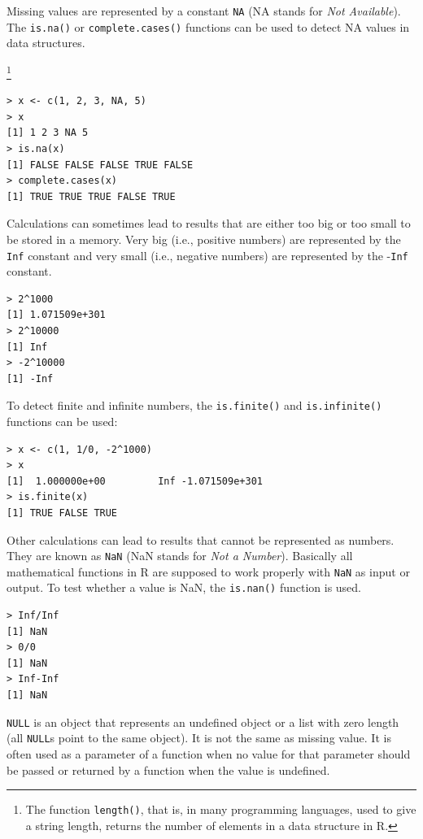 Missing values are represented by a constant \texttt{NA} (NA stands for \textit{Not Available}).
The \texttt{is.na()} or \texttt{complete.cases()} functions can be used to detect NA values
in data structures.

\footnote{The function \texttt{length()}, that is, in many programming languages, used to give a string length, returns the number of elements in a data structure in R.}

\begin{verbatim}
> x <- c(1, 2, 3, NA, 5)
> x
[1] 1 2 3 NA 5
> is.na(x)
[1] FALSE FALSE FALSE TRUE FALSE
> complete.cases(x)
[1] TRUE TRUE TRUE FALSE TRUE
\end{verbatim}

Calculations can sometimes lead to results that are either too big or too small
to be stored in a memory. Very big (i.e., positive numbers) are represented by the
\texttt{Inf} constant and very small (i.e., negative numbers) are represented by the -\texttt{Inf}
constant.

\begin{verbatim}
> 2^1000
[1] 1.071509e+301
> 2^10000
[1] Inf
> -2^10000
[1] -Inf
\end{verbatim}

To detect finite and infinite numbers, the \texttt{is.finite()} and \texttt{is.infinite()}
functions can be used:

\begin{verbatim}
> x <- c(1, 1/0, -2^1000)
> x
[1]  1.000000e+00         Inf -1.071509e+301
> is.finite(x)
[1] TRUE FALSE TRUE
\end{verbatim}

Other calculations can lead to results that cannot be represented as numbers.
They are known as \texttt{NaN} (NaN stands for \textit{Not a Number}). Basically all mathematical functions in R are supposed to work properly with \texttt{NaN} as input or output. To
test whether a value is NaN, the \texttt{is.nan()} function is used.

\begin{verbatim}
> Inf/Inf
[1] NaN
> 0/0
[1] NaN
> Inf-Inf
[1] NaN
\end{verbatim}

\texttt{NULL} is an object that represents an undefined object or a list with zero length
(all \texttt{NULL}s point to the same object). It is not the same as missing value. It is
often used as a parameter of a function when no value for that parameter should
be passed or returned by a function when the value is undefined.

